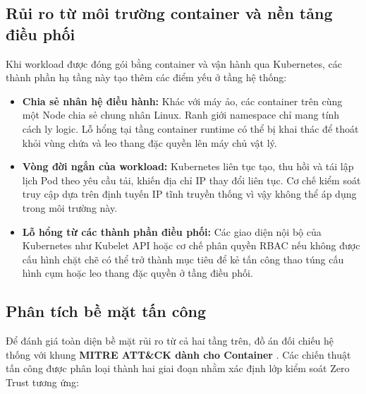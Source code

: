 \subsection{Rủi ro từ môi trường container và nền tảng điều phối}

Khi workload được đóng gói bằng container và vận hành qua Kubernetes, các thành phần hạ tầng này tạo thêm các điểm yếu ở tầng hệ thống:

\begin{itemize}[itemsep=6pt, parsep=0pt]
    \item \textbf{Chia sẻ nhân hệ điều hành:}
    Khác với máy ảo, các container trên cùng một Node chia sẻ chung nhân Linux. Ranh giới namespace chỉ mang tính cách ly logic. Lỗ hổng tại tầng container runtime có thể bị khai thác để thoát khỏi vùng chứa và leo thang đặc quyền lên máy chủ vật lý.

    \item \textbf{Vòng đời ngắn của workload:}
    Kubernetes liên tục tạo, thu hồi và tái lập lịch Pod theo yêu cầu tải, khiến địa chỉ IP thay đổi liên tục. Cơ chế kiểm soát truy cập dựa trên định tuyến IP tĩnh truyền thống vì vậy không thể áp dụng trong môi trường này.

    \item \textbf{Lỗ hổng từ các thành phần điều phối:}
    Các giao diện nội bộ của Kubernetes như Kubelet API hoặc cơ chế phân quyền RBAC nếu không được cấu hình chặt chẽ có thể trở thành mục tiêu để kẻ tấn công thao túng cấu hình cụm hoặc leo thang đặc quyền ở tầng điều phối.
\end{itemize}

\subsection{Phân tích bề mặt tấn công}

Để đánh giá toàn diện bề mặt rủi ro từ cả hai tầng trên, đồ án đối chiếu hệ thống với khung \textbf{MITRE ATT\&CK dành cho Container} \parencite{mitre_containers}. Các chiến thuật tấn công được phân loại thành hai giai đoạn nhằm xác định lớp kiểm soát Zero Trust tương ứng:

